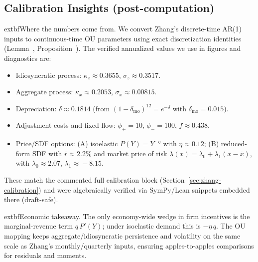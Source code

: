 ﻿\documentclass[11pt,letterpaper,oneside]{article}
\numberwithin{equation}{section}
\newcommand{\1}{\mathbf{1}}
\begin{document}

\printbibliography[heading=bibintoc,title={References}]

\subsection*{Calibration Insights (post-computation)}
\begin{tcolorbox}[didacticstyle]
	extbf{Where the numbers come from.} We convert Zhang's discrete-time AR(1) inputs to continuous-time OU parameters using exact discretization identities (Lemma~, Proposition~). The verified annualized values we use in figures and diagnostics are:
\begin{itemize}[leftmargin=1.1em,itemsep=0.2em]
  \item Idiosyncratic process: $\kappa_z\!\approx\!0.3655$, $\sigma_z\!\approx\!0.3517$.
  \item Aggregate process: $\kappa_x\!\approx\!0.2053$, $\sigma_x\!\approx\!0.00815$.
  \item Depreciation: $\delta\!\approx\!0.1814$ (from $(1-\delta_{\text{mo}})^{12}=e^{-\delta}$ with $\delta_{\text{mo}}=0.015$).
  \item Adjustment costs and fixed flow: $\phi_+=10$, $\phi_-=100$, $f\!\approx\!0.438$.
  \item Price/SDF options: (A) isoelastic $P(Y)=Y^{-\eta}$ with $\eta\!\approx\!0.12$; (B) reduced-form SDF with $\bar r\!\approx\!2.2\%$ and market price of risk $\lambda(x)=\lambda_0+\lambda_1(x-\bar x)$, with $\lambda_0\!\approx\!2.07$, $\lambda_1\!\approx\!-8.15$.
\end{itemize}
These match the commented full calibration block (Section~\ref{sec:zhang-calibration}) and were algebraically verified via SymPy/Lean snippets embedded there (draft-safe).
\end{tcolorbox}

\begin{tcolorbox}[literaturestyle]
	extbf{Economic takeaway.} The only economy-wide wedge in firm incentives is the marginal-revenue term $q\,P'(Y)$; under isoelastic demand this is $-\eta\,q$. The OU mapping keeps aggregate/idiosyncratic persistence and volatility on the same scale as Zhang's monthly/quarterly inputs, ensuring apples-to-apples comparisons for residuals and moments.
\end{tcolorbox}
\end{document}
